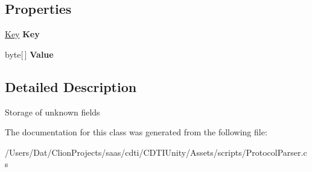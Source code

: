 \subsection*{Properties}
\begin{DoxyCompactItemize}
\item 
\hyperlink{class_silent_orbit_1_1_protocol_buffers_1_1_key}{Key} {\bfseries Key}\hypertarget{class_silent_orbit_1_1_protocol_buffers_1_1_key_value_a041f3d9740a6df457ea3c74d2b024b7f}{}\label{class_silent_orbit_1_1_protocol_buffers_1_1_key_value_a041f3d9740a6df457ea3c74d2b024b7f}

\item 
byte\mbox{[}$\,$\mbox{]} {\bfseries Value}\hypertarget{class_silent_orbit_1_1_protocol_buffers_1_1_key_value_a358b40d160e891e8cdd9039d86469f60}{}\label{class_silent_orbit_1_1_protocol_buffers_1_1_key_value_a358b40d160e891e8cdd9039d86469f60}

\end{DoxyCompactItemize}


\subsection{Detailed Description}
Storage of unknown fields 



The documentation for this class was generated from the following file\+:\begin{DoxyCompactItemize}
\item 
/\+Users/\+Dat/\+Clion\+Projects/saas/cdti/\+C\+D\+T\+I\+Unity/\+Assets/scripts/Protocol\+Parser.\+cs\end{DoxyCompactItemize}
